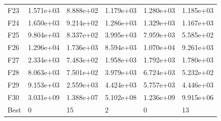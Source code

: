 \begin{tabular}{llllll}
F23  &  1.571e+03 &  8.888e+02 &  1.179e+03 &  1.280e+03 &  1.185e+03 \\
F24  &  1.650e+03 &  9.214e+02 &  1.286e+03 &  1.329e+03 &  1.167e+03 \\
F25  &  9.804e+03 &  8.337e+02 &  3.995e+03 &  7.959e+03 &  5.585e+02 \\
F26  &  1.296e+04 &  1.736e+03 &  8.594e+03 &  1.070e+04 &  9.261e+03 \\
F27  &  2.334e+03 &  7.483e+02 &  1.958e+03 &  1.792e+03 &  1.780e+03 \\
F28  &  8.063e+03 &  7.501e+02 &  3.979e+03 &  6.724e+03 &  5.232e+02 \\
F29  &  9.153e+03 &  2.559e+03 &  4.424e+03 &  5.757e+03 &  4.446e+03 \\
F30  &  3.031e+09 &  1.388e+07 &  5.102e+08 &  1.236e+09 &  9.915e+06 \\
Best &          0 &         15 &          2 &          0 &         13 \\
\bottomrule
\end{tabular}
